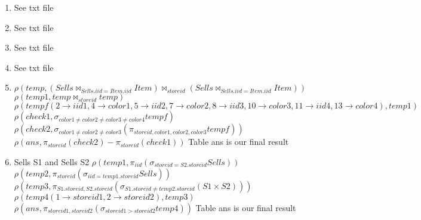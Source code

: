 \documentclass{4320hw}
\begin{document}

\maketitle

\begin{exercises}
\item
\begin{enumerate}
\item
See txt file

\item
See txt file

\item
See txt file

\item
See txt file

\item
$\rho(temp, (Sells \bowtie_{Sells.iid=Item.iid} Item) \bowtie_{storeid} (Sells \bowtie_{Sells.iid=Item.iid} Item) )$
\newline
$\rho(temp1, temp \bowtie_{storeid} temp)$
\newline
$\rho(tempf(2 \rightarrow iid1, 4 \rightarrow color1, 5 \rightarrow iid2, 7 \rightarrow color2, 8 \rightarrow iid3, 10 \rightarrow color3, 11 \rightarrow iid4, 13 \rightarrow color4),  temp1)$
\newline
$\rho(check1, \sigma_{color1 \neq color2 \neq color3 \neq color4} tempf)$
\newline
$\rho(check2, \sigma_{color1 \neq color2 \neq color3 } (\pi_{storeid,color1, color2,color3} tempf))$
\newline
$\rho(ans, \pi_{storeid} (check2) - \pi_{storeid} (check1) )$
\newline
Table ans is our final result

\item
Sells S1 and Sells S2
\newline
$\rho(temp1, \pi_{iid} (\sigma_{storeid=S2.storeid} Sells))$
\newline
$\rho(temp2, \pi_{storeid} (\sigma_{iid=temp1.storeid} Sells))$
\newline
$\rho(temp3, \pi_{S1.storeid, S2.storeid} (\sigma_{S1.storeid \neq temp2.storeid} (S1 \times S2)))$
\newline
$\rho(temp4(1 \rightarrow storeid1, 2 \rightarrow storeid2), temp3)$
\newline
$\rho(ans, \pi_{storeid1, storeid2} (\sigma_{storeid1>storeid2} temp4))$
\newline
Table ans is our final result


\end{enumerate}
\end{exercises}
\end{document}
